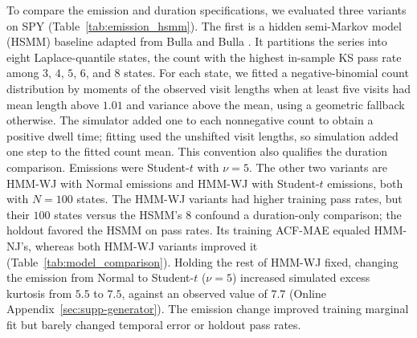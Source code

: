 To compare the emission and duration specifications, we evaluated
three variants on SPY (Table~\ref{tab:emission_hsmm}). The first is a
hidden semi-Markov model (HSMM) baseline adapted from Bulla and Bulla
\cite{bullaBulla2006}. It partitions the series into eight
Laplace-quantile states, the count with the highest in-sample KS pass
rate among $3$, $4$, $5$, $6$, and $8$ states. For each state, we fitted a negative-binomial count distribution
by moments of the observed visit lengths when at least five visits
had mean length above $1.01$ and variance above the mean, using a
geometric fallback otherwise. The simulator added one to each
nonnegative count to obtain a positive dwell time; fitting used the unshifted visit lengths, so simulation added one step to the fitted count mean. This convention also qualifies the duration comparison. Emissions were Student-$t$ with $\nu = 5$.
The other two variants are HMM-WJ with Normal emissions and HMM-WJ
with Student-$t$ emissions, both with $N = 100$ states. The HMM-WJ variants had higher training pass rates, but their $100$ states versus the HSMM's $8$ confound a duration-only comparison; the holdout favored the HSMM on pass rates. Its training ACF-MAE equaled HMM-NJ's, whereas both HMM-WJ variants improved it (Table~\ref{tab:model_comparison}). Holding the rest of HMM-WJ fixed, changing the emission
from Normal to Student-$t$ ($\nu=5$) increased simulated excess
kurtosis from $5.5$ to $7.5$, against an observed value of $7.7$
(Online Appendix~\ref{sec:supp-generator}). The emission change improved training marginal fit but barely changed temporal error or holdout pass rates.

